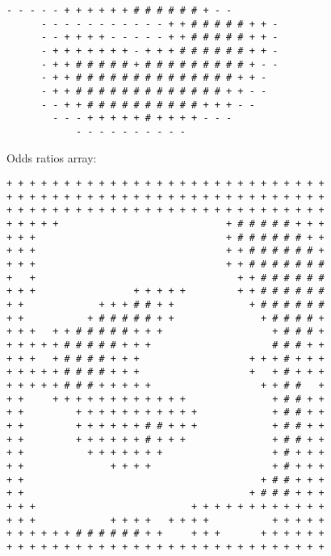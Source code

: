 \begin{multicols*}{2}
\begin{Verbatim}[samepage=true]
        - - - - - + + + + + + # # # # # # + - -         
      - - - - - - - - - - - + + # # # # # + + -         
      - - + + + + - - - - - + + # # # # # + + -         
      - + + + + + + + - + + + # # # # # # + + -         
      - + + # # # # # + # # # # # # # # # + - -         
      - + + # # # # # # # # # # # # # # + + -           
      - + + # # # # # # # # # # # # # + + - -           
      - - + + # # # # # # # # # # + + + - -             
        - - - + + + + + # + + + + - - -                 
            - - - - - - - - - -                         
\end{Verbatim}
\newpage
Odds ratios array:
\begin{Verbatim}[samepage=true]
+ + + + + + + + + + + + + + + + + + + + + + + + + + + + 
+ + + + + + + + + + + + + + + + + + + + + + + + + + + + 
+ + + + + + + + + + + + + + + + + + + + + + + + + + + + 
+ + + + +                             + # # # # # + + + 
+ + +                                 + # # # # # # + + 
+ + +                                 + + # # # # # # + 
+ + +                                 + + # # # # # # # 
+   +                                   + + # # # # # # 
+ + +                 + + + + +         + + # # # # # # 
+ +             + + + # # + +             + # # # # # # 
+ +           + # # # # # + +               + # # # # + 
+ + +   + + # # # # # + + +                   + # # # + 
+ + + + + # # # # # + + +                     # # # + + 
+ + +   + # # # # + + +                   + + + # + + + 
+ + + + + # # # # + + +                   +   + # + + + 
+ + + + + # # # + + + + +                   + + # #   + 
+ +     + + + + + + + + + + + +               + # # + + 
+ +         + + + + + + + + + + +             + # # + + 
+ +         + + + + + + # # + + +             + # # + + 
+ +         + + + + + + # + + +               + # # + + 
+ +           + + + + + + +                   + # + + + 
+ +               + + + +                     + # + + + 
+ +                                         + # # + + + 
+ +                                       + # # # + + + 
+ + +                           + + + + + + + + + + + + 
+ + +             + + + +   + + + +           + + + + + 
+ + + + + + # # # # # # + +     + + +       + + + + + + 
+ + + + + + + + + + + + + + + + + + + + + + + + + + + + 
\end{Verbatim}


\end{multicols*}
